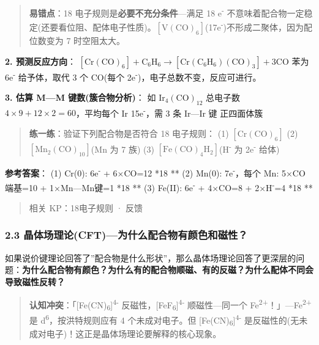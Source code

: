 \begin{quote}
\textbf{易错点}：18 电子规则是\textbf{必要不充分条件}---满足 18 e\textsuperscript{-} 不意味着配合物一定稳定(还要看位阻、配体电子性质)。\([\mathrm{V(CO)_6}]\)(17e\textsuperscript{-})不形成二聚体，因为配位数变为 7 时空阻太大。
\end{quote}

\textbf{2. 预测反应方向}：
\([\mathrm{Cr(CO)_6}] + \mathrm{C_6H_6} \rightarrow [\mathrm{Cr(C_6H_6)(CO)_3}] + 3\mathrm{CO}\)
苯为 6e\textsuperscript{-} 给予体，取代 3 个 CO(每个 2e\textsuperscript{-})，电子总数不变，反应可进行。

\textbf{3. 估算 M---M 键数(簇合物分析)}：
如 \(\mathrm{Ir_4(CO)_{12}}\) \箭 总电子数 \(4 \times 9 + 12 \times 2 = 60\)，平均每个 Ir 15e\textsuperscript{-}，需 3 条 Ir---Ir 键 \箭 正四面体簇

\begin{quote}
\textbf{练一练}：验证下列配合物是否符合 18 电子规则：
(1) \(\mathrm{[Cr(CO)_6]}\)
(2) \(\mathrm{[Mn_2(CO)_{10}]}\)(Mn 为 7 族)
(3) \(\mathrm{[Fe(CO)_4H_2]}\)(H\textsuperscript{-} 为 2e\textsuperscript{-} 给体)
\end{quote}

\textbf{参考答案}：
(1) Cr(0): 6e\textsuperscript{-} + 6×CO=12 \箭 **18 **
(2) Mn(0): 7e\textsuperscript{-}，每个 Mn: 5×CO端基=10 + 1×Mn---Mn键=1 \箭 **18 **
(3) Fe(II): 6e\textsuperscript{-} + 4×CO=8 + 2×H\textsuperscript{-}=4 \箭 **18 **

\begin{quote}
相关 KP：18电子规则 · 反馈
\end{quote}

\subsubsection{2.3 晶体场理论(CFT)---为什么配合物有颜色和磁性？}\label{ux6676ux4f53ux573aux7406ux8bbacftux4e3aux4ec0ux4e48ux914dux5408ux7269ux6709ux989cux8272ux548cux78c1ux6027}

如果说价键理论回答了''配合物是什么形状''，那么晶体场理论回答了更深层的问题：\textbf{为什么配合物有颜色？为什么有的配合物顺磁、有的反磁？为什么配体不同会导致磁性反转？}

\begin{quote}
\textbf{认知冲突}：「{[}Fe(CN)\textsubscript{6}{]}\textsuperscript{4-} 反磁性，{[}FeF\textsubscript{6}{]}\textsuperscript{4-} 顺磁性---同一个 Fe\textsuperscript{2+}！」---Fe\textsuperscript{2+} 是 d\textsuperscript{6}，按洪特规则应有 4 个未成对电子。但 {[}Fe(CN)\textsubscript{6}{]}\textsuperscript{4-} 是反磁性的(无未成对电子)！这正是晶体场理论要解释的核心现象。
\end{quote}

